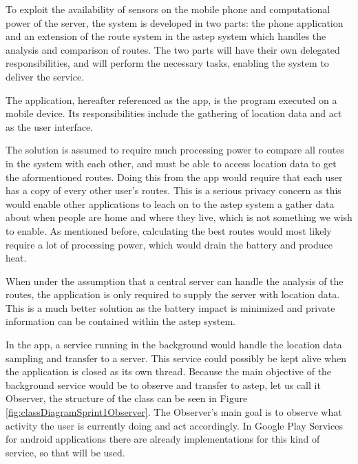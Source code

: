To exploit the availability of sensors on the mobile phone and computational power of the server, the system is developed in two parts: the phone application and an extension of the route system in the \gls{astep} system which handles the analysis and comparison of routes.
The two parts will have their own delegated responsibilities, and will perform the necessary tasks, enabling the system to deliver the service.

The application, hereafter referenced as the app, is the program executed on a mobile device.
Its responsibilities include the gathering of location data and act as the user interface. 

The solution is assumed to require much processing power to compare all routes in the system with each other, and must be able to access location data to get the aformentioned routes.
Doing this from the app would require that each user has a copy of every other user's routes.
This is a serious privacy concern as this would enable other applications to leach on to the \gls{astep} system a gather data about when people are home and where they live, which is not something we wish to enable.
As mentioned before, calculating the best routes would most likely require a lot of processing power, which would drain the battery and produce heat.

When under the assumption that a central server can handle the analysis of the routes, the application is only required to supply the server with location data.
This is a much better solution as the battery impact is minimized and private information can be contained within the \gls{astep} system.

%	

In the app, a service running in the background would handle the location data sampling and transfer to a server.
This service could possibly be kept alive when the application is closed as its own thread.
Because the main objective of the background service would be to observe and transfer to \gls{astep}, let us call it Observer, the structure of the class can be seen in Figure \ref{fig:classDiagramSprint1Observer}.
The Observer's main goal is to observe what activity the user is currently doing and act accordingly.
In Google Play Services for android applications there are already implementations for this kind of service, so that will be used.

